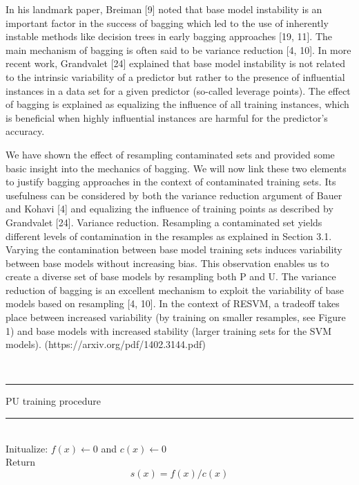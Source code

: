 In his landmark paper, Breiman [9] noted that base model instability is an important factor in the success of bagging which led to the use of inherently instable methods like decision trees in early bagging approaches [19, 11]. The main mechanism of bagging is often said to be variance reduction [4, 10]. In more recent work, Grandvalet [24] explained that base model instability is not related to the intrinsic variability of a predictor but rather to the presence of inﬂuential instances in a data set for a given predictor (so-called leverage points).
The eﬀect of bagging is explained as equalizing the inﬂuence of all training instances, which is beneﬁcial when highly inﬂuential instances are harmful for the predictor’s accuracy.

We have shown the eﬀect of resampling contaminated sets and provided some basic insight into the mechanics of bagging. We will now link these two elements to justify bagging approaches in the context of contaminated training sets. Its usefulness can be considered by both the variance reduction argument of Bauer and Kohavi [4] and equalizing the inﬂuence of training points as described by Grandvalet [24]. Variance reduction. Resampling a contaminated set yields diﬀerent levels of contamination in the resamples as explained in Section 3.1. Varying the contamination between base model training sets induces variability between base models without increasing bias. This observation enables us to create a diverse set of base models by resampling both P and U. The variance reduction of bagging is an excellent mechanism to exploit the variability of base models based on resampling [4, 10]. In the context of RESVM, a tradeoﬀ takes place between increased variability (by training on smaller resamples, see Figure 1) and base models with increased stability (larger training sets for the SVM models). (https://arxiv.org/pdf/1402.3144.pdf)

\hfill \\

\begin{algorithm}[H]
\noindent\rule{12cm}{1.1pt}
\caption{PU training procedure}\label{alg:alg1}
\noindent\rule{6cm}{0.4pt}\\
Initualize: 
\(f(x) \leftarrow 0\) and 
\(c(x) \leftarrow 0\)\\
Return \[s(x) = f(x)/c(x)\]
\hfill \\

\end{algorithm}

